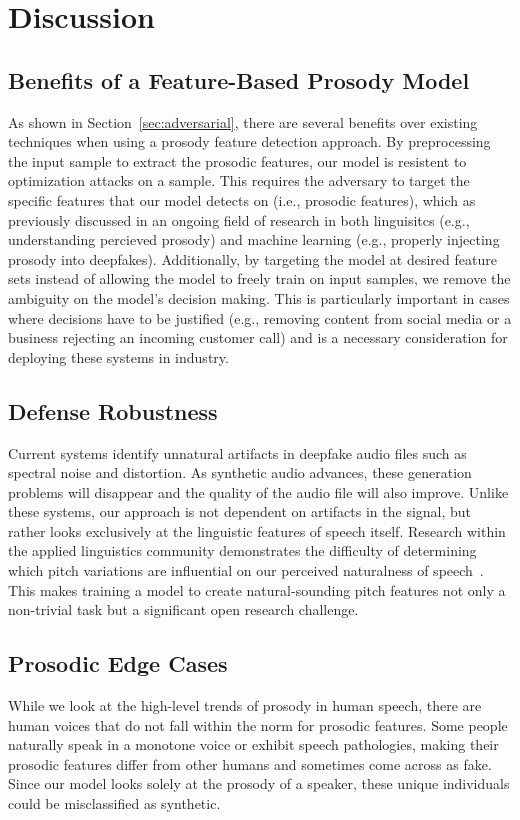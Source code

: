\documentclass[10pt, journal, anonymous=true]{IEEEtran}
\begin{document}
\section{Discussion} \label{sec:disc} 

\subsection{Benefits of a Feature-Based Prosody Model}

As shown in Section~\ref{sec:adversarial}, there are several benefits over existing techniques when using a prosody feature detection approach. By preprocessing the input sample to extract the prosodic features, our model is resistent to optimization attacks on a sample. This requires the adversary to target the specific features that our model detects on (i.e., prosodic features), which as previously discussed in an ongoing field of research in both linguisitcs (e.g., understanding percieved prosody) and machine learning (e.g., properly injecting prosody into deepfakes). Additionally, by targeting the model at desired feature sets instead of allowing the model to freely train on input samples, we remove the ambiguity on the model's decision making. This is particularly important in cases where decisions have to be justified (e.g., removing content from social media or a business rejecting an incoming customer call) and is a necessary consideration for deploying these systems in industry. 

\subsection{Defense Robustness}
Current systems identify unnatural artifacts in deepfake audio files
such as spectral noise and distortion. As synthetic audio advances, these
generation problems will disappear and the quality of the audio file will also
improve. Unlike these systems, our approach is not dependent on artifacts in
the signal, but rather looks exclusively at the linguistic features of
speech itself. Research within the applied linguistics community demonstrates the difficulty of
determining which pitch variations are influential on our perceived
naturalness of speech~\cite{nooteboom1997prosody}. This makes training a
model to create natural-sounding pitch features not only a non-trivial task but
a significant open research challenge. 


\subsection{Prosodic Edge Cases}
While we look at the high-level trends of prosody in human speech, there are
human voices that do not fall within the norm for prosodic features. Some
people naturally speak in a monotone voice or exhibit speech pathologies, making
their prosodic features differ from other humans and sometimes come across as
fake. Since our model looks solely at the prosody of a speaker, these unique
individuals could be misclassified as synthetic. 
\end{document}
